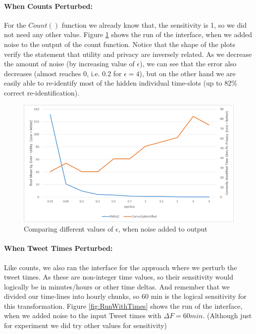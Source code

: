 \documentclass[12pt]{report}
\theoremstyle{named}
\begin{document}
\paragraph{When Counts Perturbed:\\}
For the $Count()$ function we already know that, the sensitivity is 1, so we did not need any other value. Figure \ref{fig:RunWithCounts} shows the run of the interface, when we added noise to the output of the count function. Notice that the shape of the plots verify the statement that utility and privacy are inversely related. As we decrease the amount of noise (by increasing value of $\epsilon$), we can see that the error also decreases (almost reaches 0, i.e. 0.2 for $\epsilon = 4$), but on the other hand we are easily able to re-identify most of the hidden individual time-slots (up to 82\% correct re-identification). 
\begin{figure}[ht]
\centering
        \includegraphics[width=150mm,scale=1]{Images/Counts.png}
    \caption{Comparing different values of $\epsilon$, when noise added to output}
    \label{fig:RunWithCounts}
\end{figure}

\paragraph{When Tweet Times Perturbed:\\}
Like counts, we also ran the interface for the approach where we perturb the tweet times. As these are non-integer time values, so their sensitivity would logically be in minutes/hours or other time deltas. And remember that we divided our time-lines into hourly chunks, so 60 min is the logical sensitivity for this transformation. Figure \ref{fig:RunWithTimes} shows the run of the interface, when we added noise to the input Tweet times with $\Delta F = 60 min$. (Although just for experiment we did try other values for sensitivity)
\end{document}
